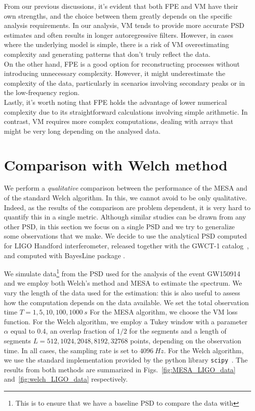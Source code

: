 \documentclass{aa}
\begin{document}
From our previous discussions, it's evident that both FPE and VM have their own strengths, and the choice between them greatly depends on the specific analysis requirements. In our analysis, VM tends to provide more accurate PSD estimates and often results in longer autoregressive filters. However, in cases where the underlying model is simple, there is a risk of VM overestimating complexity and generating patterns that don't truly reflect the data.\\ 
On the other hand, FPE is a good option for reconstructing processes without introducing unnecessary complexity. However, it might underestimate the complexity of the data, particularly in scenarios involving secondary peaks or in the low-frequency region.\\ 

Lastly, it's worth noting that FPE holds the advantage of lower numerical complexity due to its straightforward calculations involving simple arithmetic. In contrast, VM requires more complex computations, dealing with arrays that might be very long depending on the analysed data.

\section{Comparison with Welch method}\label{sec:Welch_comparison}

We perform a {\it qualitative} comparison between the performance of the MESA and of the standard Welch algorithm.
In this, we cannot avoid to be only qualitative. Indeed, as the results of the comparison are problem dependent, it is very hard to quantify this in a single metric. Although similar studies can be drawn from any other PSD, in this section we focus on a single PSD and we try to generalize some observations that we make.
We decide to use the analytical PSD computed for LIGO Handford interferometer, released together with the GWCT-1 catalog~\citep{GWTC1, PSD_release}, and computed with BayesLine package \citep{Cornish_2015, Littenberg_2015, Cornish_2020, Chatziioannou_2019}.

We simulate data\footnote{This is to ensure that we have a baseline PSD to compare the data with} from the PSD used for the analysis of the event GW150914 and we employ both Welch's method and MESA to estimate the spectrum.
We vary the length of the data used for the estimation: this is also useful to assess how the computation depends on the data available. We set the total observation time $T = 1, 5, 10, 100, 1000 \SI{}{s}$
For the MESA algorithm, we choose the VM loss function. For the Welch algorithm, we employ a Tukey window with a parameter $\alpha$ 
equal to 0.4, an overlap fraction of $1/2$ for the segments and a length of 
segments $L = 512, 1024, 2048, 8192, 32768$ points, depending on the observation time.
In all cases, the sampling rate is set to $\SI{4096}{Hz}$.
For the Welch algorithm, we use the standard implementation provided by the python library \texttt{scipy}~\citep{numpy,scipy}.
The results from both methods are summarized in  Figs.~\ref{fig:MESA_LIGO_data} and~\ref{fig:welch_LIGO_data} respectively.
\end{document}
